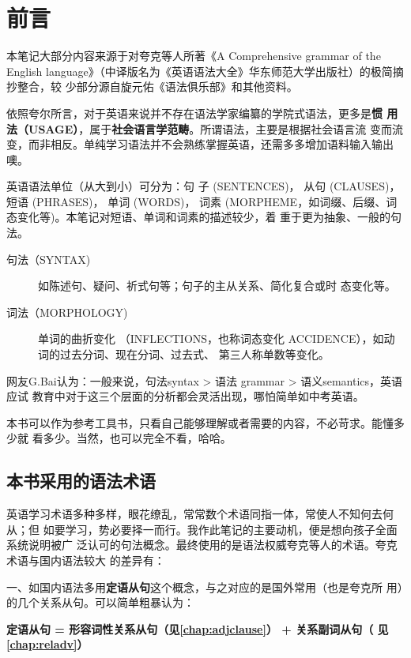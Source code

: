 \chapter{前言}

本笔记大部分内容来源于对夸克等人所著《A Comprehensive grammar of the English
language》（中译版名为《英语语法大全》华东师范大学出版社）的极简摘抄整合，较
少部分源自旋元佑《语法俱乐部》和其他资料。


依照夸尔所言，对于英语来说并不存在语法学家编纂的学院式语法，更多是\textbf{惯
  用法（USAGE）}，属于\textbf{社会语言学范畴}。所谓语法，主要是根据社会语言流
变而流变，而非相反。单纯学习语法并不会熟练掌握英语，还需多多增加语料输入输出噢。

英语语法单位（从大到小）可分为：句
子 (SENTENCES)， 从句 (CLAUSES)， 短语 (PHRASES)， 单词 (WORDS)， 词素
(MORPHEME，如词缀、后缀、词态变化等)。本笔记对短语、单词和词素的描述较少，着
重于更为抽象、一般的句法。
\begin{description}
\item [句法（SYNTAX)] 如陈述句、疑问、祈式句等；句子的主从关系、简化复合或时
  态变化等。
\item [词法（MORPHOLOGY)] 单词的曲折变化
  （INFLECTIONS，也称词态变化 ACCIDENCE），如动词的过去分词、现在分词、过去式、
  第三人称单数等变化。
\end{description}

网友G.Bai认为：一般来说，句法syntax > 语法 grammar > 语义semantics，英语应试
教育中对于这三个层面的分析都会灵活出现，哪怕简单如中考英语。

本书可以作为参考工具书，只看自己能够理解或者需要的内容，不必苛求。能懂多少就
看多少。当然，也可以完全不看，哈哈。

\section*{本书采用的语法术语}

英语学习术语多种多样，眼花缭乱，常常数个术语同指一体，常使人不知何去何从；但
如要学习，势必要择一而行。我作此笔记的主要动机，便是想向孩子全面系统说明被广
泛认可的句法概念。最终使用的是语法权威夸克等人的术语。夸克术语与国内语法较大
的差异有：

一、如国内语法多用\textbf{定语从句}这个概念，与之对应的是国外常用（也是夸克所
用）的几个关系从句。可以简单粗暴认为：

\textbf{定语从句 = 形容词性关系从句（见\cref{chap:adjclause}） + 关系副词从句（
  见\cref{chap:reladv}）}

